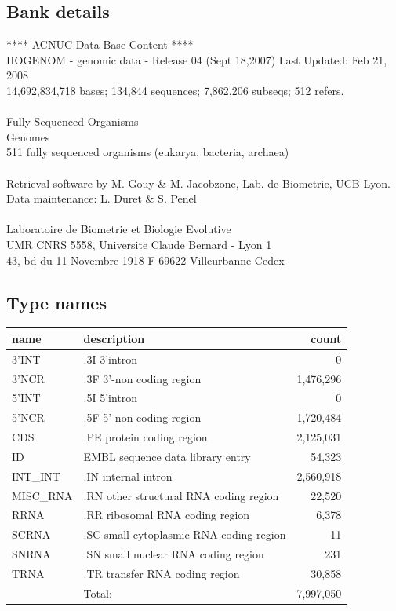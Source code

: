 \documentclass{article}
\begin{document}
\begin{Schunk}
\subsection{Bank details}
               ****     ACNUC Data Base Content      ****                      \\
 HOGENOM - genomic data - Release 04 (Sept 18,2007) Last Updated: Feb 21, 2008\\
14,692,834,718 bases; 134,844 sequences; 7,862,206 subseqs; 512 refers.\\
                                                                               \\
                        Fully Sequenced Organisms\\
   				Genomes \\
	  511 fully sequenced organisms (eukarya, bacteria, archaea)\\
\\
Retrieval software by M. Gouy \& M. Jacobzone, Lab. de Biometrie, UCB Lyon.\\
Data maintenance: L. Duret \& S. Penel\\
\\
Laboratoire de Biometrie et Biologie Evolutive\\
UMR CNRS 5558, Universite Claude Bernard - Lyon 1 \\
43, bd du 11 Novembre 1918 F-69622 Villeurbanne Cedex\\


\subsection{Type names}
\noindent\begin{tabular}{llr}
\hline \hline
name & description & count \\
\hline
3'INT  &  .3I 3'intron  &  0 \\
3'NCR  &  .3F  3'-non coding region  &  1,476,296 \\
5'INT  &  .5I 5'intron  &  0 \\
5'NCR  &  .5F  5'-non coding region  &  1,720,484 \\
CDS  &  .PE protein coding region  &  2,125,031 \\
ID  &  EMBL sequence data library entry  &  54,323 \\
INT\_INT  &  .IN  internal intron  &  2,560,918 \\
MISC\_RNA  &  .RN other structural RNA coding region  &  22,520 \\
RRNA  &  .RR ribosomal RNA coding region  &  6,378 \\
SCRNA  &  .SC small cytoplasmic RNA coding region  &  11 \\
SNRNA  &  .SN small nuclear RNA coding region  &  231 \\
TRNA  &  .TR transfer RNA coding region  &  30,858 \\
\hline
 & Total: & 7,997,050 \\
\hline \hline
\end{tabular}


\end{Schunk}
\end{document}
